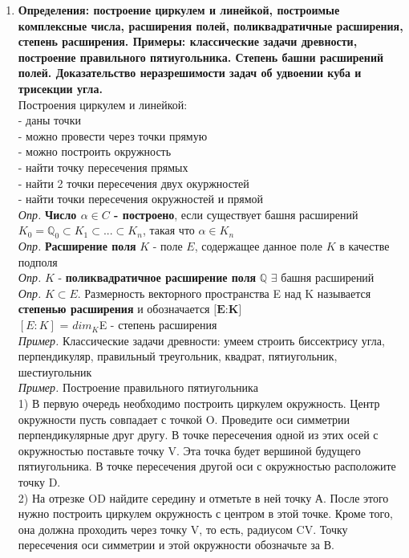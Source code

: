 \documentclass[12pt, oneside]{book}
\theoremstyle{definition}
\begin{document}
\begin{enumerate}
\item \textbf{Определения: построение циркулем и линейкой, построимые комплексные числа, расширения полей, поликвадратичные расширения, степень расширения. Примеры: классические задачи древности, построение правильного пятиугольника. Степень башни расширений полей. Доказательство неразрешимости задач об удвоении куба и трисекции угла.}\\
Построения циркулем и линейкой:\\
- даны точки\\
- можно провести через точки прямую\\
- можно построить окружность\\
- найти точку пересечения прямых\\
- найти 2 точки пересечения двух окуржностей\\
- найти точки пересечения окружностей и прямой\\
\textit{Опр.} \textbf{Число $\alpha \in {C}$ - построено}, если существует башня расширений ${K_0} = {\mathbb{Q}_0} \subset {K_1} \subset ... \subset {K_n}$, такая что $\alpha \in {K_n}$\\
\textit{Опр.} \textbf{Расширение поля} $K$ - поле $E$, содержащее данное поле $K$ в качестве подполя\\
\textit{Опр.} $K$ - \textbf{поликвадратичное расширение поля} $\mathbb{Q}$ \Leftrightarrow $\exists$ башня расширений\\
\textit{Опр.} ${K} \subset {E}$. Размерность векторного пространства {E} над {K} называется \textbf{степенью расширения} и обозначается $\textbf{[{E}:{K}]}$\\
$[{E}:{K}]$ = ${dim_K}$E - степень расширения\\
\textit{Пример.} Классические задачи древности: умеем строить биссектрису угла, перпендикуляр, правильный треугольник, квадрат, пятиугольник, шестиугольник\\
\textit{Пример.} Построение правильного пятиугольника\\
1) В первую очередь необходимо построить циркулем окружность. Центр окружности пусть совпадает с точкой O. Проведите оси симметрии перпендикулярные друг другу. В точке пересечения одной из этих осей с окружностью поставьте точку V. Эта точка будет вершиной будущего пятиугольника. В точке пересечения другой оси с окружностью расположите точку D.\\
2) На отрезке OD найдите середину и отметьте в ней точку А. После этого нужно построить циркулем окружность с центром в этой точке. Кроме того, она должна проходить через точку V, то есть, радиусом CV. Точку пересечения оси симметрии и этой окружности обозначьте за В.\\

\end{enumerate}
\end{document}
